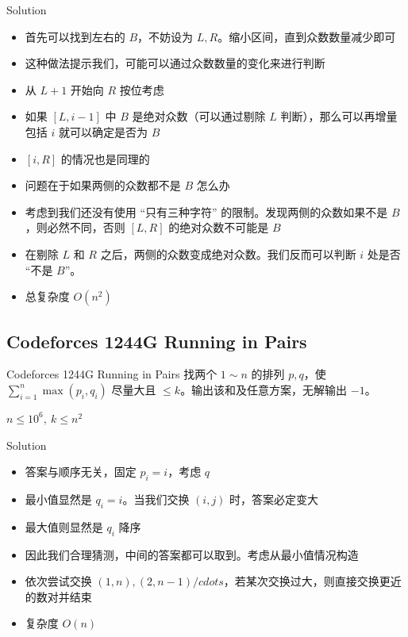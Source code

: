﻿\documentclass[aspectratio=169]{ctexbeamer}
\begin{document}
\begin{frame}{Solution}
    \begin{itemize}
        \item 首先可以找到左右的 $B$，不妨设为 $L,R$。缩小区间，直到众数数量减少即可
        \item 这种做法提示我们，可能可以通过众数数量的变化来进行判断
        \item 从 $L+1$ 开始向 $R$ 按位考虑
        \item 如果 $[L,i-1]$ 中 $B$ 是绝对众数（可以通过剔除 $L$ 判断），那么可以再增量包括 $i$ 就可以确定是否为 $B$
        \item $[i,R]$ 的情况也是同理的
        \item 问题在于如果两侧的众数都不是 $B$ 怎么办
        \item 考虑到我们还没有使用 “只有三种字符” 的限制。发现两侧的众数如果不是 $B$ ，则必然不同，否则 $[L,R]$ 的绝对众数不可能是 $B$
        \item 在剔除 $L$ 和 $R$ 之后，两侧的众数变成绝对众数。我们反而可以判断 $i$ 处是否 “不是 $B$”。
        \item 总复杂度 $O(n^2)$
    \end{itemize}
\end{frame}







\subsection{Codeforces 1244G Running in Pairs}
\begin{frame}{Codeforces 1244G Running in Pairs}
    找两个 $1\sim n$ 的排列 $p,q$，使 $\displaystyle\sum_{i=1}^n\max(p_i,q_i)$ 尽量大且 $\le k$。输出该和及任意方案，无解输出 $-1$。
    
    $n\le 10^6,\ k\le n^2$
\end{frame}

\begin{frame}{Solution}
    \begin{itemize}
        \item 答案与顺序无关，固定 $p_i=i$，考虑 $q$
        \item 最小值显然是 $q_i=i$。当我们交换 $(i,j)$ 时，答案必定变大
        \item 最大值则显然是 $q_i$ 降序
        \item 因此我们合理猜测，中间的答案都可以取到。考虑从最小值情况构造
        \item 依次尝试交换 $(1,n),(2,n-1)/cdots$，若某次交换过大，则直接交换更近的数对并结束
        \item 复杂度 $O(n)$ 
    \end{itemize}
\end{frame}
\end{document}
